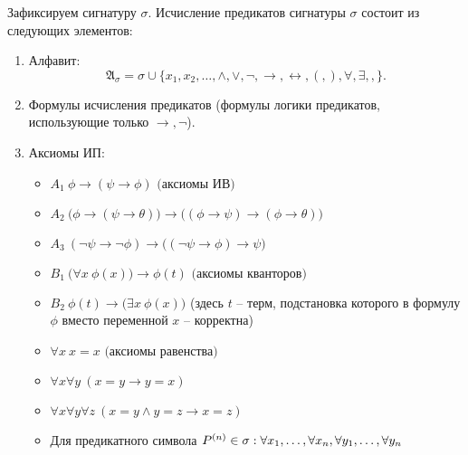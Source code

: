 \begin{definition}
    Зафиксируем сигнатуру $ \sigma $. Исчисление предикатов сигнатуры $ \sigma $ состоит из следующих элементов:
    \begin{enumerate}
        \item Алфавит:
              \[
                  \mathfrak{A}_\sigma = \sigma \cup \{x_1,x_2,\ldots,\land,\lor,\lnot,\rightarrow,\leftrightarrow, (,),\forall,\exists, ,\}.
              \]
        \item Формулы исчисления предикатов (формулы логики предикатов, использующие только $ \rightarrow, \lnot $).
        \item Аксиомы ИП:
              \begin{itemize}
                  \item $A_1 \ \phi \rightarrow (\psi \rightarrow \phi) \text{ (аксиомы ИВ)} $                                                                          \\
                  \item $A_2 \ \bigl(\phi \rightarrow (\psi \rightarrow \theta)\bigr)\rightarrow \bigl((\phi \rightarrow\psi)\rightarrow(\phi \rightarrow\theta)\bigr)$ \\
                  \item $A_3 \ (\lnot\psi \rightarrow \lnot\phi) \rightarrow \bigl((\lnot \psi \rightarrow\phi)\rightarrow\psi\bigr)$                                   \\
                  \item $B_1 \ \bigl(\forall x \ \phi(x)\bigr) \rightarrow \phi(t) \text{ (аксиомы кванторов)}$                                                         \\
                  \item $B_2 \ \phi(t) \rightarrow \bigl(\exists x \ \phi(x)\bigr)$
                        (здесь $ t $ -- терм, подстановка которого в формулу $ \phi $ вместо переменной $ x $ -- корректна) \\
                  \item $\forall x \ x = x \text{ (аксиомы равенства)}$   \\
                  \item $\forall x \forall y \ (x = y \rightarrow y = x)$ \\
                  \item $\forall x \forall y \forall z \ (x = y \land y = z \rightarrow x = z)$ \\
                  \item Для предикатного символа $ P^{(n)}\in \sigma: \\ \forall x_1,\ldots,\forall x_n,\forall y_1,\ldots,\forall y_n $

\end{itemize}
\end{enumerate}
\end{definition}
